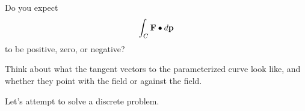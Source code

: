\documentclass{ximera}
\begin{document}
\begin{question}
\begin{image}
  \end{image}
  Do you expect 
  \[
  \int_C \mathbf{F}\bullet \mathop{}\!d \mathbf{p} 
  \]
  to be positive, zero, or negative?
  \begin{prompt}
  \begin{multipleChoice}
  \end{multipleChoice}
  \begin{hint}
    Think about what the tangent vectors to the parameterized curve
    look like, and whether they point with the field or against the
    field.
  \end{hint}
  \end{prompt}
\end{question}

Let's attempt to solve a discrete problem.
\end{document}
